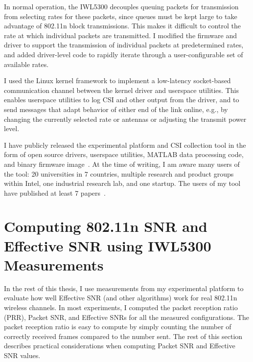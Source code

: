  In normal operation, the IWL5300 decouples queuing packets for transmission from selecting rates for these packets, since queues must be kept large to take advantage of 802.11n block transmissions. This makes it difficult to control the rate at which individual packets are transmitted. I modified the firmware and driver to support the transmission of individual packets at predetermined rates, and added driver-level code to rapidly iterate through a user-configurable set of available rates.

 I used the Linux kernel  framework to implement a low-latency socket-based communication channel between the kernel driver and userspace utilities. This enables userspace utilities to log CSI and other output from the driver, and to send messages that adapt behavior of either end of the link online, e.g., by changing the currently selected rate or antennas or adjusting the transmit power level.

 I have publicly released the experimental platform and CSI collection tool in the form of open source drivers, userspace utilities, MATLAB data processing code, and binary firmware image~\cite{Halperin_csitool}. At the time of writing, I am aware many users of the tool: 20 universities in 7 countries, multiple research and product groups within Intel, one industrial research lab, and one startup. The users of my tool have published at least 7 papers~\cite{Bhartia_FreqDiv,Crepaldi_CSI_SF,Gong_MuMIMO,Perahia_Doppler,Sen_SpinLoc,Sen_PinLoc,Wu_FILA}.

\section{Computing 802.11n SNR and Effective SNR using IWL5300 Measurements}
In the rest of this thesis, I use measurements from my experimental platform to evaluate how well Effective SNR (and other algorithms) work for real 802.11n wireless channels. In most experiments, I computed the packet reception ratio (PRR), Packet SNR, and Effective SNRs for all the measured configurations. The packet reception ratio is easy to compute by simply counting the number of correctly received frames compared to the number sent. The rest of this section describes practical considerations when computing Packet SNR and Effective SNR values.

